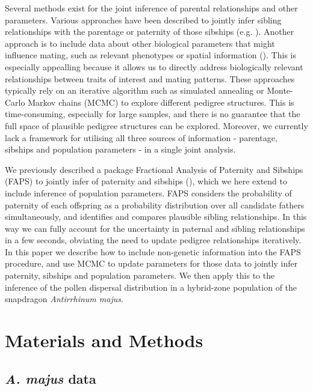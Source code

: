 \documentclass[10pt, a4paper, twocolumn]{article} %
\begin{document}
Several methods exist for the joint inference of parental relationships and other parameters.
Various approaches have been described to jointly infer sibling relationships with the parentage or paternity of those sibships (e.g. \cite{emery2001assignment, thomas2002sibship, jones2007estimating, wang2004sibship, anderson2016bayesian, huisman2017pedigree}).
Another approach is to include data about other biological parameters that might influence mating, such as relevant phenotypes or spatial information (\cite{neff2001bayesian, hadfield2006towards}).
This is especially appealling because it allows us to directly address biologically relevant relationships between traits of interest and mating patterns.
These approaches typically rely on an iterative algorithm such as simulated annealing or Monte-Carlo Markov chains (MCMC) to explore different pedigree structures.
This is time-consuming, especially for large samples, and there is no guarantee that the full space of plausible pedigree structures can be explored.
Moreover, we currently lack a framework for utilising all three sources of information - parentage, sibships and population parameters - in a single joint analysis.

We previously described a package Fractional Analysis of Paternity and Sibships (FAPS) to jointly infer of paternity and sibships (\cite{ellis2018efficient}), which we here extend to include inference of population parameters.
FAPS considers the probability of paternity of each offspring as a probability distribution over all candidate fathers simultaneously, and identifies and compares plausible sibling relationships.
In this way we can fully account for the uncertainty in paternal and sibling relationships in a few seconds, obviating the need to update pedigree relationships iteratively.
In this paper we describe how to include non-genetic information into the FAPS procedure, and use MCMC to update parameters for those data to jointly infer paternity, sibships and population parameters.
We then apply this to the inference of the pollen dispersal distribution in a hybrid-zone population of the snapdragon \textit{Antirrhinum majus}.


\section{Materials and Methods}

\subsection{\textit{A. majus} data}
\end{document}
